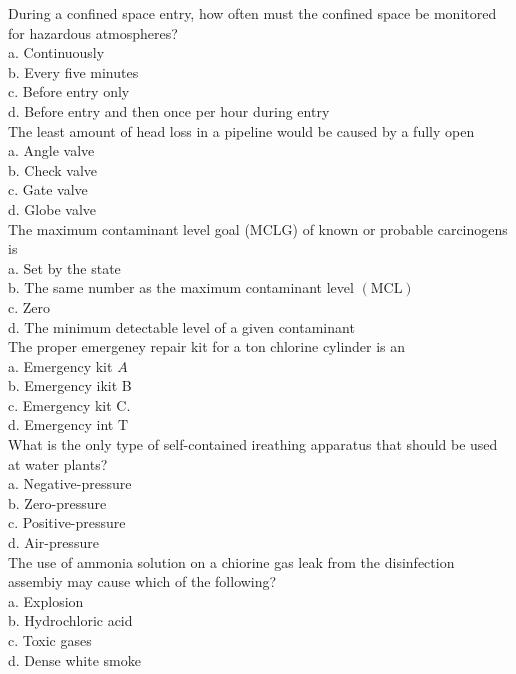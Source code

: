 During a confined space entry, how often must the confined space be monitored for hazardous atmospheres?\\
a. Continuously\\
b. Every five minutes\\
c. Before entry only\\
d. Before entry and then once per hour during entry\\

The least amount of head loss in a pipeline would be caused by a fully open\\
a. Angle valve\\
b. Check valve\\
c. Gate valve\\
d. Globe valve\\

The maximum contaminant level goal (MCLG) of known or probable carcinogens is\\
a. Set by the state\\
b. The same number as the maximum contaminant level $(\mathrm{MCL})$\\
c. Zero\\
d. The minimum detectable level of a given contaminant\\

The proper emergeney repair kit for a ton chlorine cylinder is an\\
a. Emergency kit $A$\\
b. Emergency ikit B\\
c. Emergency kit C.\\
d. Emergency int $\mathrm{T}$\\

What is the only type of self-contained ireathing apparatus that should be used at water plants?\\
a. Negative-pressure\\
b. Zero-pressure\\
c. Positive-pressure\\
d. Air-pressure\\

The use of ammonia solution on a chiorine gas leak from the disinfection assembiy may cause which of the following?\\
a. Explosion\\
b. Hydrochloric acid\\
c. Toxic gases\\
d. Dense white smoke\\

